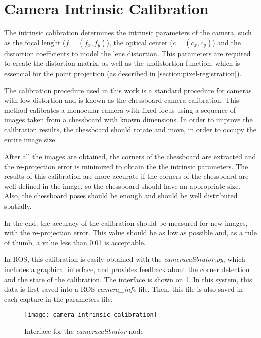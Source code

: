 \section{Camera Intrinsic Calibration}
\label{section:camera-intrinsic-calibration}

The intrinsic calibration determines the intrinsic parameters of the camera, such as the focal lenght ($f = (f_x, f_y)$), the optical center ($c = (c_x, c_y)$) and the distortion coefficients to model the lens distortion. This parameters are required to create the distortion matrix, as well as the undistortion function, which is essencial for the point projection (as described in \cref{section:pixel-registration}).

The calibration procedure used in this work is a standard procedure for cameras with low distortion and is known as the chessboard camera calibration. This method calibrates a monocular camera with fixed focus using a sequence of images taken from a chessboard with known dimensions. In order to improve the calibration results, the chessboard should rotate and move, in order to occupy the entire image size.

After all the images are obtained, the corners of the chessboard are extracted and the re-projection error is minimized to obtain the the intrinsic parameters. The results of this calibration are more accurate if the corners of the chessboard are well defined in the image, so the chessboard should have an appropriate size. Also, the chessboard poses should be enough and should be well distributed spatially.

In the end, the accuracy of the calibration should be measured for new images, with the re-projection error. This value should be as low as possible and, as a rule of thumb, a value less than \num{0.01} is acceptable.

In ROS, this calibration is easily obtained with the \emph{cameracalibrator.py}, which includes a graphical interface, and provides feedback about the corner detection and the state of the calibration. The interface is shown on \cref{figure:camera-calibrator}. In this system, this data is first saved into a ROS \emph{camera\_info} file. Then, this file is also saved in each capture in the parameters file.

\begin{figure}
    
    \centering
    \texttt{[image: camera-intrinsic-calibration]}

    \caption{Interface for the \emph{cameracalibrator} node}
    \label{figure:camera-calibrator}

\end{figure}